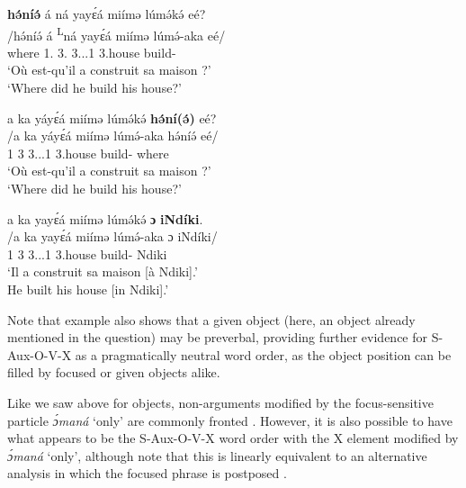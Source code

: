 \documentclass[output=paper,colorlinks,citecolor=brown
]{langscibook}
\begin{document}
\ea \label{wherebuilthouse}
\begin{xlist}[Q2:]
\label{wherebuilthouseQ}
\glll
{\db}\textbf{hə́níə́}	á \ds{}ná	yayɛ́á	miímə	lúmə́kə́ eé? \\
/hə́níə́	á \textsuperscript{L}ná	yayɛ́á	miímə	lúmə́-aka eé/ \\
{\db}where	1\SM{}.\REL{} \PST{}3.\REL{}	3.\POSS{}.\PRO{}.1{}	3.house	build-\DUR{}  \Q{} \\
\glt
`Où est-qu'il a construit sa maison ?' \\ `Where did he build his house?' \jambox*{[JO 1115] }

\label{wherebuilthouseQ2}
\glll
{\db}a ka yáyɛ́á miímə lúmə́kə́ \textbf{hə́ní(ə́)} eé? \\
/a ka yáyɛ́á miímə lúmə́-aka hə́níə́ eé/ \\
{\db}1\SM{} \PST{}3	3.\POSS{}.\PRO{}.1{}	3.house	build-\DUR{} where \Q{} \\
\glt
`Où est-qu'il a construit sa maison ?' \\ `Where did he build his house?' \jambox*{[JO 1118] }


\label{wherebuilthouseA}
\glll
{\db}a ka yayɛ́á miímə lúmə́kə́ \textbf{ɔ} \textbf{iNdíki}. \\
/a ka yayɛ́á miímə lúmə́-aka ɔ iNdíki/ \\
{\db}1\SM{} \PST{}3{} 3.\POSS{}.\PRO{}.1{} 3.house build-\DUR{} \PREP{} Ndiki \\
\glt
`Il a construit sa maison [à Ndiki]\textsubscript{\FOC{}}.' \\ He built his house [in Ndiki]\textsubscript{\FOC{}}.' \jambox*{[JO, 1121] }
\end{xlist}
\z

Note that example  also shows that a given object (here, an object already mentioned in the question) may be preverbal, providing further evidence for S-Aux-O-V-X as a pragmatically neutral word order, as the object position can be filled by focused or given objects alike.

Like we saw above for objects, non-arguments modified by the focus-sensitive particle \textit{ɔ́maná} `only' are commonly fronted . However, it is also possible to have what appears to be the S-Aux-O-V-X word order with the X element modified by \textit{ɔ́maná} `only', although note that this is linearly equivalent to an alternative analysis in which the focused phrase is postposed .\largerpage
\end{document}
